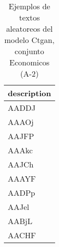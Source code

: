 \begin{table}[H]
\centering
\fontsize{8}{14}\selectfont
\caption{Ejemplos de textos aleatoreos del modelo Ctgan, conjunto Economicos (A-2)}
\label{table-sample10-economicos-a-2-ctgan-text}
\begin{tabular}{|m{50em}|}
\hline
\rowcolor[gray]{0.8}
description \\
\hline AADDJ \\
\hline AAAOj \\
\hline AAJFP \\
\hline AAAkc \\
\hline AAJCh \\
\hline AAAYF \\
\hline AADPp \\
\hline AAJel \\
\hline AABjL \\
\hline AACHF \\
\hline
\end{tabular}
\end{table}
